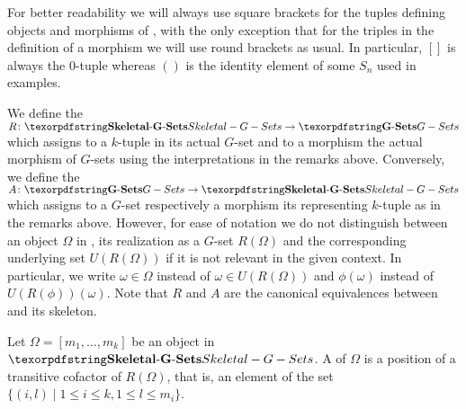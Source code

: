 \begin{rem}[Notation]
For better readability we will always use square brackets for the tuples defining objects and morphisms of \SkeletalGSets{}, with the only exception that for the triples in the definition of a morphism we will use round brackets as usual. In particular, $[]$ is always the $0$-tuple whereas $()$ is the identity element of some $S_n$ used in examples.
\end{rem}

\begin{defn}
We define the  $R \colon \SkeletalGSets \to \Gset$ which assigns to a $k$-tuple in \SkeletalGSets{} its actual $G$-set and to a morphism the actual morphism of $G$-sets using the interpretations in the remarks above. Conversely, we define the  $A\colon \Gset \to \SkeletalGSets$ which assigns to a $G$-set respectively a morphism its representing $k$-tuple as in the remarks above. However, for ease of notation we do not distinguish between an object $\Omega$ in \SkeletalGSets{}, its realization as a $G$-set $R(\Omega)$ and the corresponding underlying set $U(R(\Omega))$ if it is not relevant in the given context. In particular, we write $\omega \in \Omega$ instead of $\omega \in U(R(\Omega))$ and $\phi(\omega)$ instead of $U(R(\phi))(\omega)$. Note that $R$ and $A$ are the canonical equivalences between \Gset{} and its skeleton.
\end{defn}

\begin{defn}
Let $\Omega = [m_1,\dots,m_k]$ be an object in $\SkeletalGSets$. A  of $\Omega$ is a position of a transitive cofactor of $R(\Omega)$, that is, an element of the set $\{ (i,l) \mid 1 \leq i \leq k, 1 \leq l \leq m_i \}$.
\end{defn}

